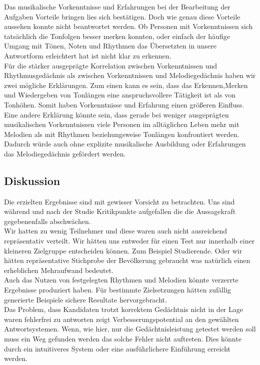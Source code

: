 \documentclass{acm_proc_article-sp}
\begin{document}
Das musikalische Vorkenntnisse und Erfahrungen bei der Bearbeitung der Aufgaben Vorteile bringen lies sich bestätigen. Doch wie genau diese Vorteile aussehen konnte nicht beantwortet werden. Ob Personen mit Vorkenntnissen sich tatsächlich die Tonfolgen besser merken konnten, oder einfach der häufige Umgang mit Tönen, Noten und Rhythmen das Übersetzten in unsere Antwortform erleichtert hat ist nicht klar zu erkennen.\\
Für die stärker ausgeprägte Korrelation zwischen Vorkenntnissen und Rhythmusgedächnis als zwischen Vorkenntnissen und Melodiegedächnis haben wir zwei mögliche Erklärungen. Zum einen kann es sein, dass das Erkennen,Merken und Wiedergeben von Tonlängen eine anspruchsvollere Tätigkeit ist als von Tonhöhen. Somit haben Vorkenntnisse und Erfahrung einen größeren Einfluss. \\
Eine andere Erklärung könnte sein, dass gerade bei weniger ausgeprägten musikalischen Vorkenntnissen viele Personen im alltäglichen Leben mehr mit Melodien als mit Rhythmen beziehungsweise Tonlängen konfrontiert werden. Dadurch würde auch ohne explizite musikalische Ausbildung oder Erfahrungen das Melodiegedächnis gefördert werden.\\

\subsection{Diskussion}
Die erzielten Ergebnisse sind mit gewisser Vorsicht zu betrachten. Uns sind während und nach der Studie Kritikpunkte aufgefallen die die Aussagekraft gegebenenfalls abschwächen.\\
Wir hatten zu wenig Teilnehmer und diese waren auch nicht ausreichend repräsentativ verteilt. Wir hätten uns entweder für einen Test nur innerhalb einer kleineren Zielgruppe entscheiden können. Zum Beispiel Studierende. Oder wir hätten repräsentative Stichprobe der Bevölkerung gebraucht was natürlich einen erheblichen Mehraufwand bedeutet.\\
Auch das Nutzen von festgelegten Rhythmen und Melodien könnte verzerrte Ergebnisse produziert haben. Für bestimmte Zielsetzungen hätten zufällig generierte Beispiele sichere Resultate hervorgebracht.\\
Das Problem, dass Kandidaten trotzt korrektem Gedächtnis nicht in der Lage waren fehlerfrei zu antworten zeigt Verbesserungspotential an den gewählten Antwortsystemen. Wenn, wie hier, nur die Gedächtnisleistung getestet werden soll muss ein Weg gefunden werden das solche Fehler nicht auftreten. Dies könnte durch ein intuitiveres System oder eine ausführlichere Einführung erreicht werden.\\
\end{document}
